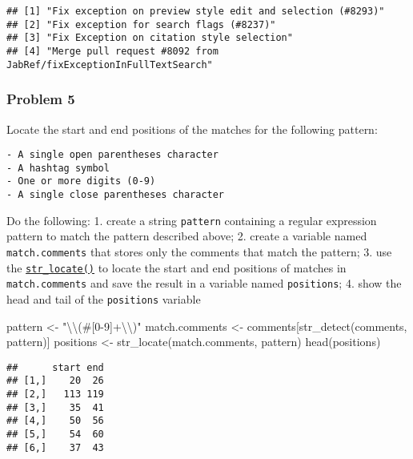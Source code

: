 \documentclass[
]{article}
\newenvironment{Shaded}{\begin{snugshade}}{\end{snugshade}}
\newcommand{\FunctionTok}[1]{\textcolor[rgb]{0.00,0.00,0.00}{#1}}
\newcommand{\NormalTok}[1]{#1}
\newcommand{\OtherTok}[1]{\textcolor[rgb]{0.56,0.35,0.01}{#1}}
\newcommand{\SpecialCharTok}[1]{\textcolor[rgb]{0.00,0.00,0.00}{#1}}
\newcommand{\StringTok}[1]{\textcolor[rgb]{0.31,0.60,0.02}{#1}}
\begin{document}
\begin{verbatim}
## [1] "Fix exception on preview style edit and selection (#8293)"        
## [2] "Fix exception for search flags (#8237)"                           
## [3] "Fix Exception on citation style selection"                        
## [4] "Merge pull request #8092 from JabRef/fixExceptionInFullTextSearch"
\end{verbatim}

\hypertarget{problem-5}{%
\subsubsection{Problem 5}\label{problem-5}}

Locate the start and end positions of the matches for the following
pattern:

\begin{verbatim}
- A single open parentheses character
- A hashtag symbol
- One or more digits (0-9)
- A single close parentheses character
\end{verbatim}

Do the following: 1. create a string \texttt{pattern} containing a
regular expression pattern to match the pattern described above; 2.
create a variable named \texttt{match.comments} that stores only the
comments that match the pattern; 3. use the
\href{https://stringr.tidyverse.org/reference/str_locate.html}{\texttt{str\_locate()}}
to locate the start and end positions of matches in
\texttt{match.comments} and save the result in a variable named
\texttt{positions}; 4. show the head and tail of the \texttt{positions}
variable

\begin{Shaded}
\begin{Highlighting}[]
\NormalTok{pattern }\OtherTok{\textless{}{-}} \StringTok{"}\SpecialCharTok{\textbackslash{}\textbackslash{}}\StringTok{(\#[0{-}9]+}\SpecialCharTok{\textbackslash{}\textbackslash{}}\StringTok{)"}
\NormalTok{match.comments }\OtherTok{\textless{}{-}}\NormalTok{ comments[}\FunctionTok{str\_detect}\NormalTok{(comments, pattern)]}
\NormalTok{positions }\OtherTok{\textless{}{-}} \FunctionTok{str\_locate}\NormalTok{(match.comments, pattern)}
\FunctionTok{head}\NormalTok{(positions)}
\end{Highlighting}
\end{Shaded}

\begin{verbatim}
##      start end
## [1,]    20  26
## [2,]   113 119
## [3,]    35  41
## [4,]    50  56
## [5,]    54  60
## [6,]    37  43
\end{verbatim}
\end{document}
